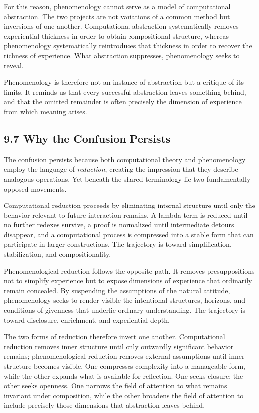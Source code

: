 \documentclass[12pt,letterpaper]{article}
\theoremstyle{remark}
\begin{document}
For this reason, phenomenology cannot serve as a model of computational abstraction. The two projects are not variations of a common method but inversions of one another. Computational abstraction systematically removes experiential thickness in order to obtain compositional structure, whereas phenomenology systematically reintroduces that thickness in order to recover the richness of experience. What abstraction suppresses, phenomenology seeks to reveal.

Phenomenology is therefore not an instance of abstraction but a critique of its limits. It reminds us that every successful abstraction leaves something behind, and that the omitted remainder is often precisely the dimension of experience from which meaning arises.

\subsection{9.7 Why the Confusion Persists}

The confusion persists because both computational theory and phenomenology employ the language of \emph{reduction}, creating the impression that they describe analogous operations. Yet beneath the shared terminology lie two fundamentally opposed movements.

Computational reduction proceeds by eliminating internal structure until only the behavior relevant to future interaction remains. A lambda term is reduced until no further redexes survive, a proof is normalized until intermediate detours disappear, and a computational process is compressed into a stable form that can participate in larger constructions. The trajectory is toward simplification, stabilization, and compositionality.

Phenomenological reduction follows the opposite path. It removes presuppositions not to simplify experience but to expose dimensions of experience that ordinarily remain concealed. By suspending the assumptions of the natural attitude, phenomenology seeks to render visible the intentional structures, horizons, and conditions of givenness that underlie ordinary understanding. The trajectory is toward disclosure, enrichment, and experiential depth.

The two forms of reduction therefore invert one another. Computational reduction removes inner structure until only outwardly significant behavior remains; phenomenological reduction removes external assumptions until inner structure becomes visible. One compresses complexity into a manageable form, while the other expands what is available for reflection. One seeks closure; the other seeks openness. One narrows the field of attention to what remains invariant under composition, while the other broadens the field of attention to include precisely those dimensions that abstraction leaves behind.
\end{document}
